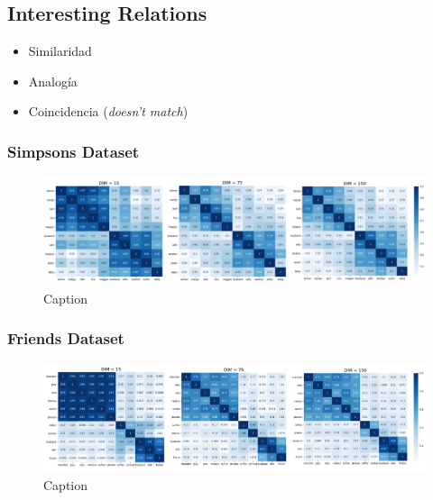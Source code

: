 \subsection{Interesting Relations}
\begin{itemize}
    \item Similaridad
    
    \item Analogía 
    
    \item Coincidencia (\textit{doesn't match})
\end{itemize}

\subsubsection{Simpsons Dataset}

\begin{figure}[H]
    \centering
    \includegraphics[width=\textwidth]{doc/images/simpsons_sim_matrix.png}
    \caption{Caption}
    \label{fig:simpsons_sim_matrix}
\end{figure}

\subsubsection{Friends Dataset}

\begin{figure}[H]
    \centering
    \includegraphics[width=\textwidth]{doc/images/friends_sim_matrix.png}
    \caption{Caption}
    \label{fig:friends_sim_matrix}
\end{figure}